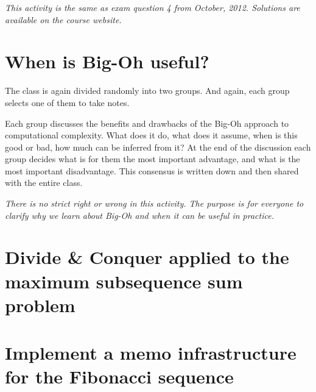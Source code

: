 \documentclass[a4paper]{article}
\begin{document}
\emph{
  This activity is the same as exam question 4 from October, 2012.
  Solutions are available on the course website.
}



\section{When is Big-Oh useful?}

The class is again divided randomly into two groups.
And again, each group selects one of them to take notes.

Each group discusses the benefits and drawbacks of the Big-Oh approach to computational complexity.
What does it do, what does it assume, when is this good or bad, how much can be inferred from it?
At the end of the discussion each group decides what is for them the most important advantage, and what is the most important disadvantage.
This consensus is written down and then shared with the entire class.

\emph{
  There is no strict right or wrong in this activity.
  The purpose is for everyone to clarify why we learn about Big-Oh and when it can be useful in practice.
}



\section{Divide \& Conquer applied to the maximum subsequence sum problem}



\section{Implement a memo infrastructure for the Fibonacci sequence}
\end{document}
